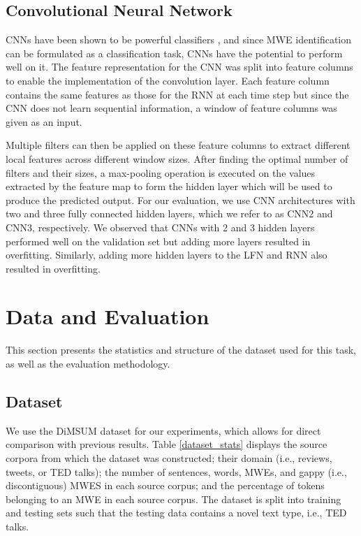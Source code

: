 \documentclass[11pt,a4paper]{article}
\begin{document}
\subsection{Convolutional Neural Network}
CNNs have been shown to be powerful classifiers
\cite{DBLP:conf/emnlp/Kim14,DBLP:conf/aaai/KimJSR16}, and since MWE
identification can be formulated as a classification task, CNNs have
the potential to perform well on it. The feature representation for
the CNN was split into feature columns to enable the implementation of
the convolution layer. Each feature column contains the same features
as those for the RNN at each time step but since the CNN does not
learn sequential information, a window of feature columns was given as
an input.

Multiple filters can then be applied on these feature columns to
extract different local features across different window sizes. After
finding the optimal number of filters and their sizes, a max-pooling
operation is executed on the values extracted by the feature map to
form the hidden layer which will be used to produce the predicted
output. For our evaluation, we use CNN architectures with two and
three fully connected hidden layers, which we refer to as CNN2 and CNN3, respectively. We observed that CNNs with 2 and 3 hidden layers performed well on the validation set but adding more layers resulted in overfitting. Similarly, adding more hidden layers to the LFN and RNN also resulted in overfitting. 




\section{Data and Evaluation}

This section presents the statistics and structure of the dataset used
for this task, as well as the evaluation methodology.

\subsection{Dataset}

We use the DiMSUM dataset \cite{DBLP:conf/semeval/SchneiderHJC16} for
our experiments, which allows for direct comparison with previous
results.
Table \ref{dataset_stats} displays the source corpora from which the
dataset was constructed; their domain (i.e., reviews, tweets, or TED
talks); the number of sentences, words, MWEs, and gappy (i.e.,
discontiguous) MWES in each source corpus; and the percentage of
tokens belonging to an MWE in each source corpus. The dataset is split
into training and testing sets such that the testing data contains a
novel text type, i.e., TED talks. 
\end{document}

